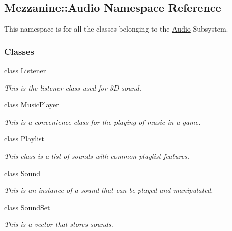 \hypertarget{namespaceMezzanine_1_1Audio}{
\subsection{Mezzanine::Audio Namespace Reference}
\label{namespaceMezzanine_1_1Audio}
}


This namespace is for all the classes belonging to the \hyperlink{namespaceMezzanine_1_1Audio}{Audio} Subsystem.  


\subsubsection*{Classes}
\begin{DoxyCompactItemize}
\item 
class \hyperlink{classMezzanine_1_1Audio_1_1Listener}{Listener}
\begin{DoxyCompactList}\small\item\em This is the listener class used for 3D sound. \item\end{DoxyCompactList}\item 
class \hyperlink{classMezzanine_1_1Audio_1_1MusicPlayer}{MusicPlayer}
\begin{DoxyCompactList}\small\item\em This is a convenience class for the playing of music in a game. \item\end{DoxyCompactList}\item 
class \hyperlink{classMezzanine_1_1Audio_1_1Playlist}{Playlist}
\begin{DoxyCompactList}\small\item\em This class is a list of sounds with common playlist features. \item\end{DoxyCompactList}\item 
class \hyperlink{classMezzanine_1_1Audio_1_1Sound}{Sound}
\begin{DoxyCompactList}\small\item\em This is an instance of a sound that can be played and manipulated. \item\end{DoxyCompactList}\item 
class \hyperlink{classMezzanine_1_1Audio_1_1SoundSet}{SoundSet}
\begin{DoxyCompactList}\small\item\em This is a vector that stores sounds. \item\end{DoxyCompactList}\end{DoxyCompactItemize}
